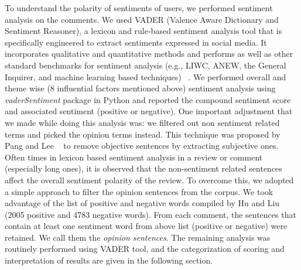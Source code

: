 To understand the polarity of sentiments of users, we performed sentiment analysis on the comments. We used VADER (Valence Aware Dictionary and Sentiment Reasoner), a lexicon and rule-based sentiment analysis tool that is specifically engineered to extract sentiments expressed in social media. It incorporates qualitative and quantitative methods and performs as well as other standard benchmarks for sentiment analysis (e.g., LIWC, ANEW, the General Inquirer, and machine
learning based techniques) ~\cite{hutto2014vader}. We performed overall and theme wise (8 influential factors mentioned above) sentiment analysis using \textit{vaderSentiment} package in Python and reported the compound sentiment score and associated sentiment (positive or negative). One important adjustment that we made while doing this analysis was: we filtered out non sentiment related terms and picked the opinion terms instead. This technique was proposed by Pang and Lee ~\cite{pang2004sentimental} to remove objective sentences by extracting subjective ones. Often times in lexicon based sentiment analysis in a review or comment (especially long ones), it is observed that the non-sentiment related sentences affect the overall sentiment polarity of the review. To overcome this, we adopted a simple approach to filter the opinion sentences from the corpus. We took advantage of the list of positive and negative words compiled by Hu and Liu~\cite{hu2004mining} (2005 positive and 4783 negative words). From each comment, the sentences that contain at least one sentiment word from above list (positive or negative) were retained. We call them the \emph{opinion sentences}. The remaining analysis was routinely performed using VADER tool, and  the categorization of scoring and interpretation of results are given in the following section.

 



